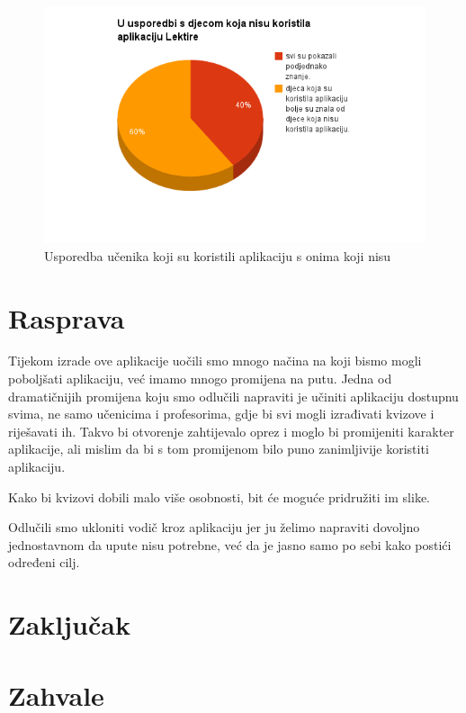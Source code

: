 \documentclass{scrreprt}
\begin{document}
\begin{figure}[H]
  \includegraphics[width=\textwidth, clip=true, trim=0 2.5cm 0 0]{comparison}
  \caption{Usporedba učenika koji su koristili aplikaciju s onima koji nisu}
\end{figure}

\chapter{Rasprava}

Tijekom izrade ove aplikacije uočili smo mnogo načina na koji bismo mogli
poboljšati aplikaciju, već imamo mnogo promijena na putu. Jedna od dramatičnijih
promijena koju smo odlučili napraviti je učiniti aplikaciju dostupnu svima, ne
samo učenicima i profesorima, gdje bi svi mogli izrađivati kvizove i riješavati
ih. Takvo bi otvorenje zahtijevalo oprez i moglo bi promijeniti karakter
aplikacije, ali mislim da bi s tom promijenom bilo puno zanimljivije koristiti
aplikaciju.

Kako bi kvizovi dobili malo više osobnosti, bit će moguće pridružiti im slike.

Odlučili smo ukloniti vodič kroz aplikaciju jer ju želimo napraviti dovoljno
jednostavnom da upute nisu potrebne, već da je jasno samo po sebi kako postići
određeni cilj.

\chapter{Zaključak}

\chapter{Zahvale}
\end{document}
